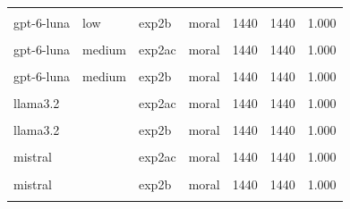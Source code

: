 \documentclass[
]{article}
\begin{document}
\begin{table}[!h]
{\begin{tabular}[t]{llllrrr}
\cellcolor{gray!10}{gpt-6-luna} & \cellcolor{gray!10}{low} & \cellcolor{gray!10}{exp2b} & \cellcolor{gray!10}{economic} & \cellcolor{gray!10}{1440} & \cellcolor{gray!10}{1440} & \cellcolor{gray!10}{1.000}\\
gpt-6-luna & low & exp2b & moral & 1440 & 1440 & 1.000\\
\cellcolor{gray!10}{gpt-6-luna} & \cellcolor{gray!10}{medium} & \cellcolor{gray!10}{exp2ac} & \cellcolor{gray!10}{economic} & \cellcolor{gray!10}{1440} & \cellcolor{gray!10}{1440} & \cellcolor{gray!10}{1.000}\\
\addlinespace
gpt-6-luna & medium & exp2ac & moral & 1440 & 1440 & 1.000\\
\cellcolor{gray!10}{gpt-6-luna} & \cellcolor{gray!10}{medium} & \cellcolor{gray!10}{exp2b} & \cellcolor{gray!10}{economic} & \cellcolor{gray!10}{1440} & \cellcolor{gray!10}{1440} & \cellcolor{gray!10}{1.000}\\
gpt-6-luna & medium & exp2b & moral & 1440 & 1440 & 1.000\\
\cellcolor{gray!10}{llama3.2} & \cellcolor{gray!10}{} & \cellcolor{gray!10}{exp2ac} & \cellcolor{gray!10}{economic} & \cellcolor{gray!10}{1440} & \cellcolor{gray!10}{1440} & \cellcolor{gray!10}{1.000}\\
llama3.2 &  & exp2ac & moral & 1440 & 1440 & 1.000\\
\addlinespace
\cellcolor{gray!10}{llama3.2} & \cellcolor{gray!10}{} & \cellcolor{gray!10}{exp2b} & \cellcolor{gray!10}{economic} & \cellcolor{gray!10}{1440} & \cellcolor{gray!10}{1440} & \cellcolor{gray!10}{1.000}\\
llama3.2 &  & exp2b & moral & 1440 & 1440 & 1.000\\
\cellcolor{gray!10}{mistral} & \cellcolor{gray!10}{} & \cellcolor{gray!10}{exp2ac} & \cellcolor{gray!10}{economic} & \cellcolor{gray!10}{1440} & \cellcolor{gray!10}{1440} & \cellcolor{gray!10}{1.000}\\
mistral &  & exp2ac & moral & 1440 & 1440 & 1.000\\
\cellcolor{gray!10}{mistral} & \cellcolor{gray!10}{} & \cellcolor{gray!10}{exp2b} & \cellcolor{gray!10}{economic} & \cellcolor{gray!10}{1440} & \cellcolor{gray!10}{1440} & \cellcolor{gray!10}{1.000}\\
\addlinespace
mistral &  & exp2b & moral & 1440 & 1440 & 1.000\\
\cellcolor{gray!10}{mistral-medium-latest} & \cellcolor{gray!10}{} & \cellcolor{gray!10}{exp2ac} & \cellcolor{gray!10}{economic} & \cellcolor{gray!10}{1440} & \cellcolor{gray!10}{1440} & \cellcolor{gray!10}{1.000}\\

\end{tabular}}
\end{table}
\end{document}
